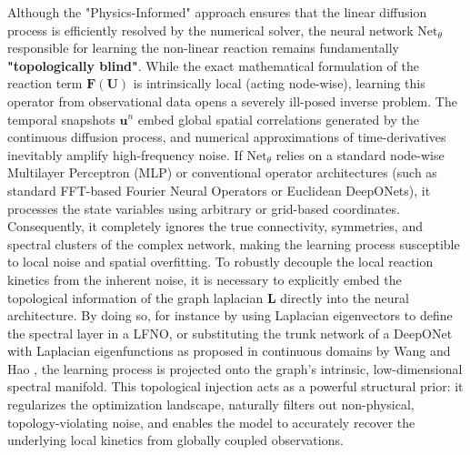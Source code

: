 Although the "Physics-Informed" approach ensures that the linear diffusion process is efficiently resolved by the numerical solver, the neural network $\text{Net}_{\theta}$ responsible for learning the non-linear reaction remains fundamentally \textbf{"topologically blind"}. While the exact mathematical formulation of the reaction term $\mathbf{F}(\mathbf{U})$ is intrinsically local (acting node-wise), learning this operator from observational data opens a severely ill-posed inverse problem. The temporal snapshots $\mathbf{u}^n$ embed global spatial correlations generated by the continuous diffusion process, and numerical approximations of time-derivatives inevitably amplify high-frequency noise. If $\text{Net}_{\theta}$ relies on a standard node-wise Multilayer Perceptron (MLP) or conventional operator architectures (such as standard FFT-based Fourier Neural Operators or Euclidean DeepONets), it processes the state variables using arbitrary or grid-based coordinates. Consequently, it completely ignores the true connectivity, symmetries, and spectral clusters of the complex network, making the learning process susceptible to local noise and spatial overfitting. To robustly decouple the local reaction kinetics from the inherent noise, it is necessary to explicitly embed the topological information of the graph laplacian $\mathbf{L}$ directly into the neural architecture. By doing so, for instance by using Laplacian eigenvectors to define the spectral layer in a LFNO, or substituting the trunk network of a DeepONet with Laplacian eigenfunctions as proposed in continuous domains by Wang and Hao \cite{wang2025laplacian}, the learning process is projected onto the graph's intrinsic, low-dimensional spectral manifold. This topological injection acts as a powerful structural prior: it regularizes the optimization landscape, naturally filters out non-physical, topology-violating noise, and enables the model to accurately recover the underlying local kinetics from globally coupled observations.

